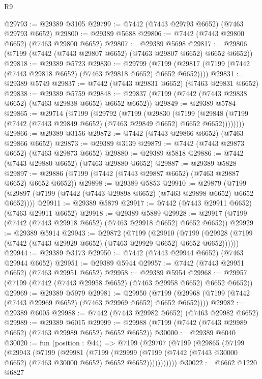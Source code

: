 \begin{lexlean}{R9}
\begin{coremodule}
@29793 := @29389 @3105
@29799 := @7442 (@7443 @29793 @6652) (@7463 @29793 @6652)
@29800 := @29389 @5688
@29806 := @7442 (@7443 @29800 @6652) (@7463 @29800 @6652)
@29807 := @29389 @5698
@29817 := @29806 (@7199 (@7442 (@7443 @29807 @6652) (@7463 @29807 @6652) @6652 @6652))
@29818 := @29389 @5723
@29830 := @29799
    (@7199 (@29817 (@7199 (@7442 (@7443 @29818 @6652) (@7463 @29818 @6652) @6652 @6652))))
@29831 := @29389 @5749
@29837 := @7442 (@7443 @29831 @6652) (@7463 @29831 @6652)
@29838 := @29389 @5759
@29848 := @29837 (@7199 (@7442 (@7443 @29838 @6652) (@7463 @29838 @6652) @6652 @6652))
@29849 := @29389 @5784
@29865 := @29714
    (@7199
      (@29792
        (@7199
          (@29830
            (@7199
              (@29848 (@7199 (@7442 (@7443 @29849 @6652) (@7463 @29849 @6652) @6652 @6652))))))))
@29866 := @29389 @3156
@29872 := @7442 (@7443 @29866 @6652) (@7463 @29866 @6652)
@29873 := @29389 @3139
@29879 := @7442 (@7443 @29873 @6652) (@7463 @29873 @6652)
@29880 := @29389 @5818
@29886 := @7442 (@7443 @29880 @6652) (@7463 @29880 @6652)
@29887 := @29389 @5828
@29897 := @29886 (@7199 (@7442 (@7443 @29887 @6652) (@7463 @29887 @6652) @6652 @6652))
@29898 := @29389 @5853
@29910 := @29879
    (@7199 (@29897 (@7199 (@7442 (@7443 @29898 @6652) (@7463 @29898 @6652) @6652 @6652))))
@29911 := @29389 @5879
@29917 := @7442 (@7443 @29911 @6652) (@7463 @29911 @6652)
@29918 := @29389 @5889
@29928 := @29917 (@7199 (@7442 (@7443 @29918 @6652) (@7463 @29918 @6652) @6652 @6652))
@29929 := @29389 @5914
@29943 := @29872
    (@7199
      (@29910
        (@7199 (@29928 (@7199 (@7442 (@7443 @29929 @6652) (@7463 @29929 @6652) @6652 @6652))))))
@29944 := @29389 @3173
@29950 := @7442 (@7443 @29944 @6652) (@7463 @29944 @6652)
@29951 := @29389 @5944
@29957 := @7442 (@7443 @29951 @6652) (@7463 @29951 @6652)
@29958 := @29389 @5954
@29968 := @29957 (@7199 (@7442 (@7443 @29958 @6652) (@7463 @29958 @6652) @6652 @6652))
@29969 := @29389 @5979
@29981 := @29950
    (@7199 (@29968 (@7199 (@7442 (@7443 @29969 @6652) (@7463 @29969 @6652) @6652 @6652))))
@29982 := @29389 @6005
@29988 := @7442 (@7443 @29982 @6652) (@7463 @29982 @6652)
@29989 := @29389 @6015
@29999 := @29988 (@7199 (@7442 (@7443 @29989 @6652) (@7463 @29989 @6652) @6652 @6652))
@30000 := @29389 @6040
@30020 := fun (position : @44) =>
  @7199
    (@29707
      (@7199
        (@29865
          (@7199
            (@29943
              (@7199
                (@29981
                  (@7199
                    (@29999
                      (@7199 (@7442 (@7443 @30000 @6652) (@7463 @30000 @6652) @6652 @6652)))))))))))
@30022 := @6662 @1220 @6827

\end{coremodule}
\end{lexlean}
